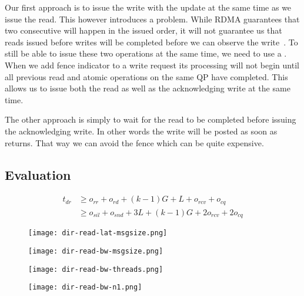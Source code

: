 Our first approach is to issue the write with the update at the same time as we issue the read. This however introduces a 
problem. While RDMA guarantees that two consecutive will happen in the issued order, it will not guarantee us that reads issued
before writes will be completed before we can observe the write~\cite{}.  To still be able to issue these two operations at the same time, we need to use a . When we add 
fence indicator to a write request its processing will not begin until all previous read and atomic operations on the same QP 
have completed. This allows us to issue both the read as well as the acknowledging write at the same time.

The other approach is simply to wait for the read to be completed before issuing the acknowledging write. In other words the
write will be posted as soon as  returns. That way we can avoid the fence which can be quite expensive.

\subsection{Evaluation}


\begin{align*}
  t_{dr} &\geq o_{rr} + o_{rd} + (k-1)G + L  + o_{rcv} + o_{cq}\\
         &\geq o_{sil} + o_{snd} + 3L  + (k-1)G  + 2o_{rcv} + 2o_{cq}
\end{align*}


\begin{figure}[htp]
\texttt{[image: dir-read-lat-msgsize.png]}
\label{fig:plot-dirread-lat}
\end{figure}


\begin{figure}[htp]
\texttt{[image: dir-read-bw-msgsize.png]}
\label{fig:plot-dirread-bw}
\end{figure}



\begin{figure}[htp]
\texttt{[image: dir-read-bw-threads.png]}
\label{fig:plot-dirread-bw-threads}
\end{figure}


\begin{figure}[htp]
\texttt{[image: dir-read-bw-n1.png]}
\label{fig:plot-dirread-bw-n1}
\end{figure}
